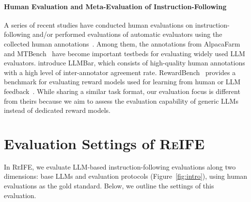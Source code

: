 \documentclass[11pt]{article}
\newcommand{\ours}{\textsc{ReIFE}\xspace}
\begin{document}
\paragraph{Human Evaluation and Meta-Evaluation of Instruction-Following} 

A series of recent studies have conducted human evaluations on instruction-following and/or performed evaluations of automatic evaluators using the collected human annotations~\cite{ zhang2023wider, wang-etal-2024-large-language-models-fair, wang2024pandalm, lan2024criticbench}.
Among them, the annotations from AlpacaFarm~\cite{dubois2024alpacafarm} and MTBench~\citep{zheng2024judging} have become important testbeds for evaluating widely used LLM evaluators. 
\citet{zeng2024evaluating} introduce LLMBar, which consists of high-quality human annotations with a high level of inter-annotator agreement rate. 
RewardBench~\citep{lambert2024rewardbench} provides a benchmark for evaluating reward models used for learning from human or LLM feedback~\citep{NEURIPS2022_b1efde53,bai2022constitutional,tunstall2023zephyr}.
% 
While sharing a similar task format, our evaluation focus is different from theirs because we aim to assess the evaluation capability of generic LLMs instead of dedicated reward models.


% 

% 


\section{Evaluation Settings of \ours}
\label{sec:data_models}
% 
In \ours, we evaluate LLM-based instruction-following evaluations along two dimensions: base LLMs and evaluation protocols (Figure~\ref{fig:intro}), using human evaluations as the gold standard.
Below, we outline the settings of this evaluation.

% 
\end{document}
